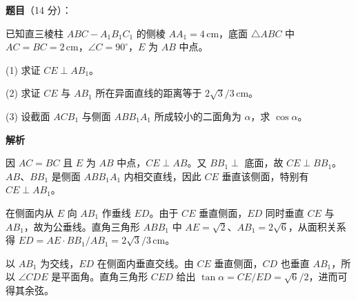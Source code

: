 \begin{answer}

\textbf{题目}（14 分）：

已知直三棱柱 $ABC-A_1B_1C_1$ 的侧棱 $AA_1=4\,\mathrm{cm}$，底面 $\triangle ABC$ 中 $AC=BC=2\,\mathrm{cm}$，$\angle C=90^\circ$，$E$ 为 $AB$ 中点。

(1) 求证 $CE\perp AB_1$。

(2) 求证 $CE$ 与 $AB_1$ 所在异面直线的距离等于 $2\sqrt3/3\,\mathrm{cm}$。

(3) 设截面 $ACB_1$ 与侧面 $ABB_1A_1$ 所成较小的二面角为 $\alpha$，求 $\cos\alpha$。
\nopagebreak[4]
\begin{center}\end{center}
\nopagebreak[4]
\textbf{解析}


因 $AC=BC$ 且 $E$ 为 $AB$ 中点，$CE\perp AB$。又 $BB_1\perp$ 底面，故 $CE\perp BB_1$。$AB$、$BB_1$ 是侧面 $ABB_1A_1$ 内相交直线，因此 $CE$ 垂直该侧面，特别有 $CE\perp AB_1$。


在侧面内从 $E$ 向 $AB_1$ 作垂线 $ED$。由于 $CE$ 垂直侧面，$ED$ 同时垂直 $CE$ 与 $AB_1$，故为公垂线。直角三角形 $ABB_1$ 中 $AE=\sqrt2$、$AB_1=2\sqrt6$，从面积关系得 $ED=AE\cdot BB_1/AB_1=2\sqrt3/3\,\mathrm{cm}$。


以 $AB_1$ 为交线，$ED$ 在侧面内垂直交线。由 $CE$ 垂直侧面，$CD$ 也垂直 $AB_1$，所以 $\angle CDE$ 是平面角。直角三角形 $CED$ 给出 $\tan\alpha=CE/ED=\sqrt6/2$，进而可得其余弦。




\end{answer}